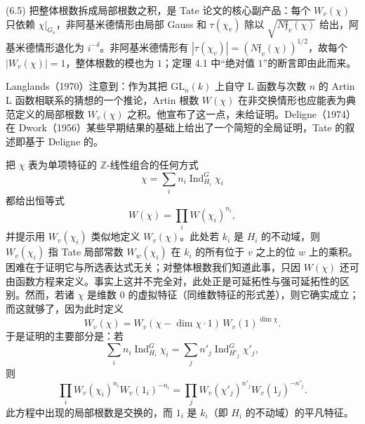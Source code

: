 \begin{annote}
(6.5) 把整体根数拆成局部根数之积，是 Tate 论文的核心副产品：每个 $W_v(\chi)$ 只依赖 $\chi|_{G_v}$，非阿基米德情形由局部 Gauss 和 $\tau(\chi_v)$ 除以 $\sqrt{N\mathfrak{f}_v(\chi)}$ 给出，阿基米德情形退化为 $i^{-\delta}$。非阿基米德情形有 $|\tau(\chi_v)|=(N\mathfrak{f}_v(\chi))^{1/2}$，故每个 $|W_v(\chi)|=1$，整体根数的模也为 $1$；定理 4.1 中“绝对值 $1$”的断言即由此而来。
\par\vspace{0.15em}{\raggedleft 【来源：Tate《Local constants》，Durham 会议录（A）；Deligne《Les constantes des équations fonctionnelles des fonctions L》（A）】\par}
\end{annote}

Langlands（1970）注意到：作为其把 $\mathrm{GL}_n(k)$ 上自守 L 函数与次数 $n$ 的 Artin L 函数相联系的猜想的一个推论，Artin 根数 $W(\chi)$ 在非交换情形也应能表为典范定义的局部根数 $W_v(\chi)$ 之积。他宣布了这一点，未给证明。Deligne（1974）在 Dwork（1956）某些早期结果的基础上给出了一个简短的全局证明，Tate 的叙述即基于 Deligne 的。

把 $\chi$ 表为单项特征的 $\mathbb{Z}$-线性组合的任何方式
\begin{equation}\tag{6.6}\label{c4:eq:6.6}
\chi=\sum_{i}n_i\operatorname{Ind}^{G}_{H_i}\chi_i
\end{equation}
都给出恒等式
\begin{equation}\tag{6.7}\label{c4:eq:6.7}
W(\chi)=\prod_{i}W(\chi_i)^{n_i},
\end{equation}
并提示用 $W_v(\chi_i)$ 类似地定义 $W_v(\chi)$。此处若 $k_i$ 是 $H_i$ 的不动域，则 $W_v(\chi_i)$ 指 Tate 局部常数 $W_w(\chi_i)$ 在 $k_i$ 的所有位于 $v$ 之上的位 $w$ 上的乘积。困难在于证明它与所选表达式无关；对整体根数我们知道此事，只因 $W(\chi)$ 还可由函数方程来定义。事实上这并不完全对，此处正是可延拓性与强可延拓性的区别。然而，若诸 $\chi$ 是维数 $0$ 的虚拟特征（同维数特征的形式差），则它确实成立；而这就够了，因为此时定义
\begin{equation}\tag{6.8}\label{c4:eq:6.8}
W_v(\chi)=W_v(\chi-\dim\chi\cdot1)\,W_v(1)^{\dim\chi}.
\end{equation}
于是证明的主要部分是：若
\begin{equation}\tag{6.9}\label{c4:eq:6.9}
\sum_{i}n_i\operatorname{Ind}^{G}_{H_i}\chi_i=\sum_{j}n'_j\operatorname{Ind}^{G}_{H'_j}\chi'_j,
\end{equation}
则
\begin{equation}\tag{6.10}\label{c4:eq:6.10}
\prod_{i}W_v(\chi_i)^{n_i}W_v(1_i)^{-n_i}
=\prod_{j}W_v(\chi'_j)^{n'_j}W_v(1_j)^{-n'_j}.
\end{equation}
此方程中出现的局部根数是交换的，而 $1_i$ 是 $k_i$（即 $H_i$ 的不动域）的平凡特征。

